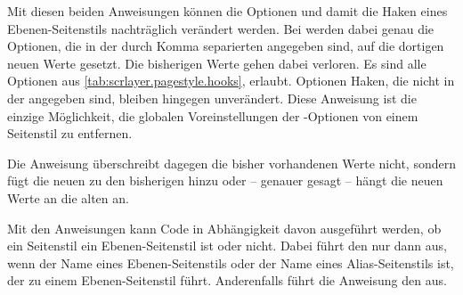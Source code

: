 \begin{Declaration}
\end{Declaration}
%
%
Mit diesen beiden Anweisungen können die Optionen und damit die
Haken eines Ebenen-Seitenstils nachträglich verändert werden. Bei
werden dabei genau die Optionen, die in der durch Komma separierten
 angegeben sind, auf die dortigen neuen Werte
gesetzt. Die bisherigen Werte gehen dabei verloren. Es sind alle Optionen aus
\autoref{tab:scrlayer.pagestyle.hooks},
 erlaubt. Optionen
 Haken, die nicht in der 
angegeben sind, bleiben hingegen unverändert. Diese Anweisung ist
die einzige Möglichkeit, die globalen Voreinstellungen der
\KOMAScript-Optionen von einem Seitenstil zu entfernen.

Die Anweisung  überschreibt dagegen die bisher vorhandenen Werte nicht, sondern
fügt die neuen zu den bisherigen hinzu oder -- genauer gesagt -- hängt die
neuen Werte an die alten an.%
\EndIndexGroup


\begin{Declaration}
\end{Declaration}
%
%
Mit den Anweisungen kann Code in Abhängigkeit davon ausgeführt werden, ob
ein Seitenstil ein Ebenen-Seitenstil ist oder nicht. Dabei führt
 den  nur dann aus, wenn
 der Name eines Ebenen-Seitenstils oder der Name eines
Alias-Seitenstils ist, der zu einem Ebenen-Seitenstil führt. Anderenfalls
führt die Anweisung den  aus.

